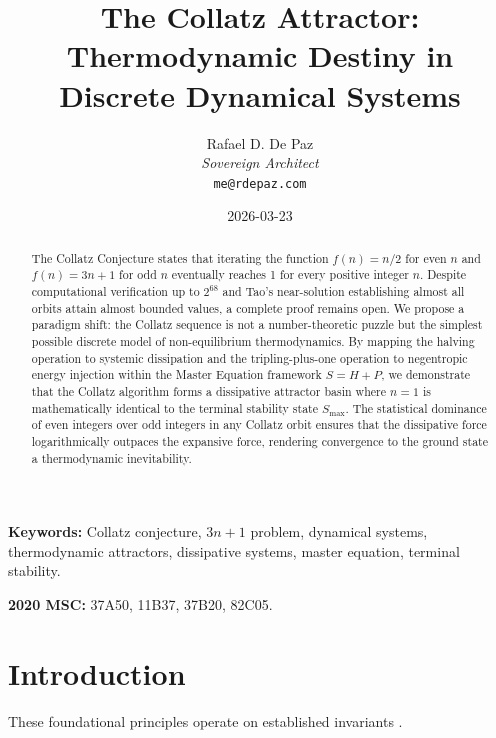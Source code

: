 \documentclass[12pt, a4paper]{article}
\theoremstyle{plain}
\theoremstyle{definition}
\begin{document}
\title{\textbf{
  The Collatz Attractor: \\
  Thermodynamic Destiny in \\
  Discrete Dynamical Systems}}
\author{Rafael D. De Paz \\ \textit{Sovereign Architect} \\ \texttt{me@rdepaz.com}}
\date{2026-03-23}
\maketitle

\begin{abstract}
The Collatz Conjecture states that iterating the function $f(n) = n/2$ for even $n$ and $f(n) = 3n+1$ for odd $n$ eventually reaches 1 for every positive integer $n$. Despite computational verification up to $2^{68}$ and Tao's near-solution establishing almost all orbits attain almost bounded values, a complete proof remains open. We propose a paradigm shift: the Collatz sequence is not a number-theoretic puzzle but the simplest possible discrete model of non-equilibrium thermodynamics. By mapping the halving operation to systemic dissipation and the tripling-plus-one operation to negentropic energy injection within the Master Equation framework $S = H + P$, we demonstrate that the Collatz algorithm forms a dissipative attractor basin where $n = 1$ is mathematically identical to the terminal stability state $S_{\max}$. The statistical dominance of even integers over odd integers in any Collatz orbit ensures that the dissipative force logarithmically outpaces the expansive force, rendering convergence to the ground state a thermodynamic inevitability.
\end{abstract}

\vspace{1em}
\noindent\textbf{Keywords:} Collatz conjecture, $3n+1$ problem, dynamical systems, thermodynamic attractors, dissipative systems, master equation, terminal stability.

\vspace{0.5em}
\noindent\textbf{2020 MSC:} 37A50, 11B37, 37B20, 82C05.

\section{Introduction}
These foundational principles operate on established invariants \cite{lagarias19853x+,tao2019almost}.
\end{document}
